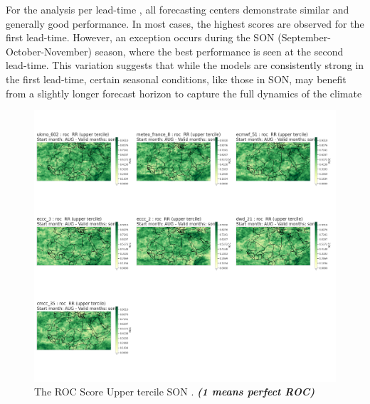 For the analysis per lead-time , all forecasting centers demonstrate similar and generally good performance. In most cases, the highest scores are observed for the first lead-time. However, an exception occurs during the SON (September-October-November) season, where the best performance is seen at the second lead-time. This variation suggests that while the models are consistently strong in the first lead-time, certain seasonal conditions, like those in SON, may benefit from a slightly longer forecast horizon to capture the full dynamics of the climate

\begin{figure}[H]
    \centering
    \includegraphics[scale=0.3]{plots/prob/roc/roc_son_RR_upper.png}
    \caption{The ROC Score Upper tercile SON    . \textbf{\textit{(1 means perfect ROC)}}}
\end{figure}


